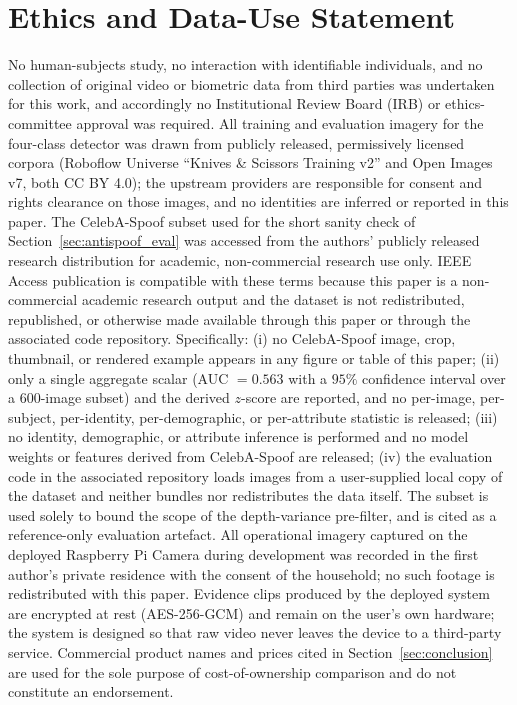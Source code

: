 \documentclass{ieeeaccess}
\begin{document}
\section*{Ethics and Data-Use Statement}
\label{sec:ethics}
No human-subjects study, no interaction with identifiable individuals, and no collection of original video or biometric data from third parties was undertaken for this work, and accordingly no Institutional Review Board (IRB) or ethics-committee approval was required. All training and evaluation imagery for the four-class detector was drawn from publicly released, permissively licensed corpora (Roboflow Universe ``Knives \& Scissors Training v2'' and Open Images v7, both CC BY 4.0); the upstream providers are responsible for consent and rights clearance on those images, and no identities are inferred or reported in this paper. The CelebA-Spoof subset used for the short sanity check of Section~\ref{sec:antispoof_eval} was accessed from the authors' publicly released research distribution for academic, non-commercial research use only. IEEE Access publication is compatible with these terms because this paper is a non-commercial academic research output and the dataset is not redistributed, republished, or otherwise made available through this paper or through the associated code repository. Specifically: (i) no CelebA-Spoof image, crop, thumbnail, or rendered example appears in any figure or table of this paper; (ii) only a single aggregate scalar (AUC $= 0.563$ with a $95\%$ confidence interval over a 600-image subset) and the derived $z$-score are reported, and no per-image, per-subject, per-identity, per-demographic, or per-attribute statistic is released; (iii) no identity, demographic, or attribute inference is performed and no model weights or features derived from CelebA-Spoof are released; (iv) the evaluation code in the associated repository loads images from a user-supplied local copy of the dataset and neither bundles nor redistributes the data itself. The subset is used solely to bound the scope of the depth-variance pre-filter, and is cited as a reference-only evaluation artefact. All operational imagery captured on the deployed Raspberry Pi Camera during development was recorded in the first author's private residence with the consent of the household; no such footage is redistributed with this paper. Evidence clips produced by the deployed system are encrypted at rest (AES-256-GCM) and remain on the user's own hardware; the system is designed so that raw video never leaves the device to a third-party service. Commercial product names and prices cited in Section~\ref{sec:conclusion} are used for the sole purpose of cost-of-ownership comparison and do not constitute an endorsement.
\end{document}
